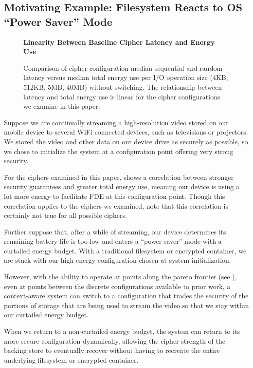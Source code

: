\subsection{Motivating Example: Filesystem Reacts to OS ``Power Saver'' Mode}

\begin{figure}[ht] \textbf{Linearity Between Baseline Cipher Latency and Energy
Use}\par\medskip
   \centering
   {} \caption{Comparison of cipher
   configuration median sequential and random latency versus median total energy
   use per I/O operation size (4KB, 512KB, 5MB, 40MB) without switching. The
   relationship between latency and total energy use is linear for the cipher
   configurations we examine in this paper.}
  \label{fig:linearity-latency-energy}
\end{figure}

Suppose we are continually streaming a high-resolution video stored on our
mobile device to several WiFi connected devices, such as televisions or
projectors. We stored the video and other data on our device drive as securely
as possible, so we chose to initialize the system at a configuration point
offering very strong security.

For the ciphers examined in this paper,  shows
a correlation between stronger security guarantees and greater total energy use,
meaning our device is using a lot more energy to facilitate FDE at this
configuration point. Though this correlation applies to the ciphers we examined,
note that this correlation is certainly not true for all possible ciphers.

Further suppose that, after a while of streaming, our device determines its
remaining battery life is too low and enters a ``power saver'' mode with a
curtailed energy budget. With a traditional filesystem or encrypted container,
we are stuck with our high-energy configuration chosen at system initialization.

However, with the ability to operate at points along the pareto frontier (see
), even at points between the discrete configurations
available to prior work, a context-aware system can switch to a configuration
that trades the security of the portions of storage that are being used to
stream the video so that we stay within our curtailed energy budget.

When we return to a non-curtailed energy budget, the system can return to its
more secure configuration dynamically, allowing the cipher strength of the
backing store to eventually recover without having to recreate the entire
underlying filesystem or encrypted container.

